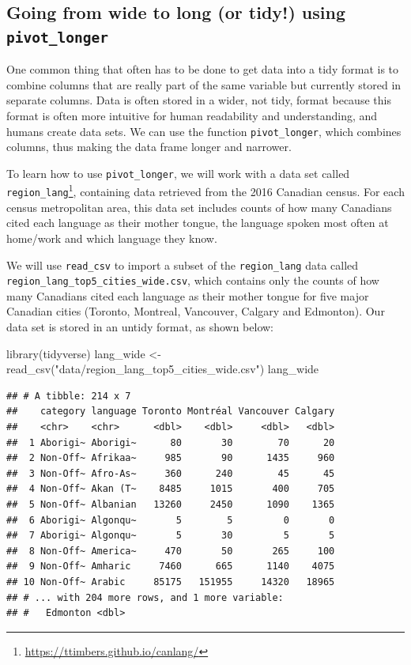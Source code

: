 \documentclass[
]{krantz}
\makeatletter
\newenvironment{Shaded}{\begin{snugshade}}{\end{snugshade}}
\newcommand{\FunctionTok}[1]{\textcolor[rgb]{0,0,0}{#1}}
\newcommand{\NormalTok}[1]{#1}
\newcommand{\OtherTok}[1]{\textcolor[rgb]{0.37,0.37,0.37}{#1}}
\newcommand{\StringTok}[1]{\textcolor[rgb]{0.5,0.5,0.5}{#1}}
\renewcommand{\href}[2]{#2\footnote{\url{#1}}}
\newenvironment{kframe}{%
\medskip{}
\setlength{\fboxsep}{.8em}
 \def\at@end@of@kframe{}%
 \ifinner\ifhmode%
  \def\at@end@of@kframe{\end{minipage}}%
  \begin{minipage}{\columnwidth}%
 \fi\fi%
 \def\FrameCommand##1{\hskip\@totalleftmargin \hskip-\fboxsep
 \colorbox{shadecolor}{##1}\hskip-\fboxsep
     \hskip-\linewidth \hskip-\@totalleftmargin \hskip\columnwidth}%
 \MakeFramed {\advance\hsize-\width
   \@totalleftmargin\z@ \linewidth\hsize
   \@setminipage}}%
 {\par\unskip\endMakeFramed%
 \at@end@of@kframe}
\renewenvironment{Shaded}{\begin{kframe}}{\end{kframe}}
\makeatother
\begin{document}
\hypertarget{going-from-wide-to-long-or-tidy-using-pivot_longer}{%
\subsection{\texorpdfstring{Going from wide to long (or tidy!) using \texttt{pivot\_longer}}{Going from wide to long (or tidy!) using pivot\_longer}}\label{going-from-wide-to-long-or-tidy-using-pivot_longer}}

One common thing that often has to be done to get data into a tidy format is to combine columns that are really part of the same variable but currently stored in separate columns. Data is often stored in a wider, not tidy, format because this format is often more intuitive for human readability and understanding, and humans create data sets. We can use the function \texttt{pivot\_longer}, which combines columns, thus making the data frame longer and narrower.

To learn how to use \texttt{pivot\_longer}, we will work with a data set called \href{https://ttimbers.github.io/canlang/}{\texttt{region\_lang}}, containing data retrieved from the 2016 Canadian census. For each census metropolitan area, this data set includes counts of how many Canadians cited each language as their mother tongue, the language spoken most often at home/work and which language they know.

We will use \texttt{read\_csv} to import a subset of the \texttt{region\_lang} data called \texttt{region\_lang\_top5\_cities\_wide.csv}, which contains only the counts of how many Canadians cited each language as their mother tongue for five major Canadian cities (Toronto, Montreal, Vancouver, Calgary and Edmonton). Our data set is stored in an untidy format, as shown below:

\begin{Shaded}
\begin{Highlighting}[]
\FunctionTok{library}\NormalTok{(tidyverse)}
\NormalTok{lang\_wide }\OtherTok{\textless{}{-}} \FunctionTok{read\_csv}\NormalTok{(}\StringTok{"data/region\_lang\_top5\_cities\_wide.csv"}\NormalTok{)}
\NormalTok{lang\_wide}
\end{Highlighting}
\end{Shaded}

\begin{verbatim}
## # A tibble: 214 x 7
##    category language Toronto Montréal Vancouver Calgary
##    <chr>    <chr>      <dbl>    <dbl>     <dbl>   <dbl>
##  1 Aborigi~ Aborigi~      80       30        70      20
##  2 Non-Off~ Afrikaa~     985       90      1435     960
##  3 Non-Off~ Afro-As~     360      240        45      45
##  4 Non-Off~ Akan (T~    8485     1015       400     705
##  5 Non-Off~ Albanian   13260     2450      1090    1365
##  6 Aborigi~ Algonqu~       5        5         0       0
##  7 Aborigi~ Algonqu~       5       30         5       5
##  8 Non-Off~ America~     470       50       265     100
##  9 Non-Off~ Amharic     7460      665      1140    4075
## 10 Non-Off~ Arabic     85175   151955     14320   18965
## # ... with 204 more rows, and 1 more variable:
## #   Edmonton <dbl>
\end{verbatim}
\end{document}
